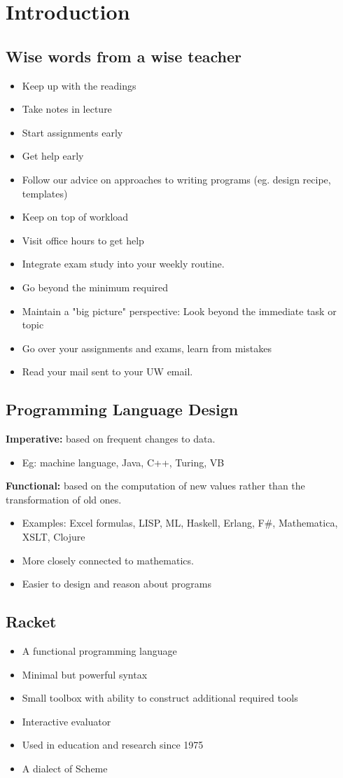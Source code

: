 \documentclass[english, 12pt]{article}
\begin{document}
\notesheader
\section{Introduction}
\subsection{Wise words from a wise teacher}
\begin{itemize}
\item Keep up with the readings
\item Take notes in lecture
\item Start assignments early
\item Get help early
\item Follow our advice on approaches to writing programs (eg. design recipe, templates)
\item Keep on top of workload
\item Visit office hours to get help
\item Integrate exam study into your weekly routine.
\item Go beyond the minimum required
\item Maintain a "big picture" perspective: Look beyond the immediate task or topic
\item Go over your assignments and exams, learn from mistakes
\item Read your mail sent to your UW email.
\end{itemize}

\subsection{Programming Language Design}
\textbf{Imperative:} based on frequent changes to data.
\begin{itemize}
\item Eg: machine language, Java, C++, Turing, VB
\end{itemize}
\textbf{Functional:} based on the computation of new values rather than the transformation of old ones.
\begin{itemize}
\item Examples: Excel formulas, LISP, ML, Haskell, Erlang, F\#, Mathematica, XSLT, Clojure
\item More closely connected to mathematics.
\item Easier to design and reason about programs
\end{itemize}
\subsection{Racket}
\begin{itemize}
\item A functional programming language
\item Minimal but powerful syntax
\item Small toolbox with ability to construct additional required tools
\item Interactive evaluator
\item Used in education and research since 1975
\item A dialect of Scheme
\end{itemize}
\end{document}
